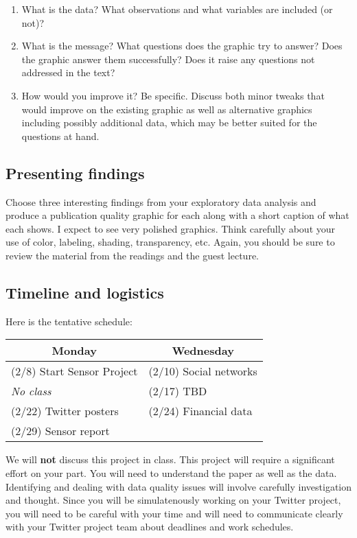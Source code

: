 \documentclass[11pt, oneside]{article}   	%
\begin{document}
\begin{enumerate}
\item What is the data?  What observations and what variables are included
  (or not)?
\item What is the message? What questions does the graphic try to answer?
  Does the graphic answer them successfully? Does it raise any questions not
  addressed in the text?
\item How would you improve it?  Be specific. Discuss both minor tweaks that
  would improve on the existing graphic as well as alternative graphics
  including possibly additional data, which may be better suited for the
  questions at hand.
\end{enumerate}

\subsection*{Presenting findings}

Choose three interesting findings from your exploratory data analysis and
produce a publication quality graphic for each along with a short caption of
what each shows. I expect to see very polished graphics. Think carefully about
your use of color, labeling, shading, transparency, etc. Again, you should be
sure to review the material from the readings and the guest lecture.

\subsection*{Timeline and logistics}

Here is the tentative schedule:

\begin{table}[h]
\centering
\begin{tabular}{@{}l|l@{}}
\toprule
\multicolumn{1}{c|}{Monday} & \multicolumn{1}{c}{Wednesday} \\
\hline
(2/8) Start Sensor Project    & (2/10) Social networks \\
\emph{\hspace{12mm} No class} & (2/17) TBD \\
(2/22) Twitter posters        & (2/24) Financial data \\
(2/29) Sensor report          & \\
\bottomrule
\end{tabular}
\end{table}

We will \textbf{not} discuss this project in class.  This project will require
a significant effort on your part.  You will need to understand the paper as
well as the data.  Identifying and dealing with data quality issues will
involve carefully investigation and thought.  Since you will be simulatenously
working on your Twitter project, you will need to be careful with your time and
will need to communicate clearly with your Twitter project team about deadlines
and work schedules.
\end{document}
